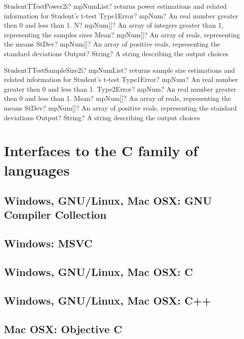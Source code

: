 \documentclass[12pt,a4paper,openany]{book}
\begin{document}
\begin{mpFunctionsExtract}
\mpFunctionFiveNotImplemented
{StudentTTestPower2i? mpNumList? returns power estimations and related information for Student's t-test}
{Type1Error? mpNum? An real number greater then 0 and less than 1.}
{N? mpNum[]? An array of integers greater than 1, representing the samples sizes}
{Mean? mpNum[]? An array of reals, representing the means}
{StDev? mpNum[]? An array of positive reals, representing the standard deviations}
{Output? String? A string describing the output choices}
\end{mpFunctionsExtract}

\begin{mpFunctionsExtract}
\mpFunctionFiveNotImplemented
{StudentTTestSampleSize2i? mpNumList? returns sample size estimations and related information for Student's t-test}
{Type1Error? mpNum? An real number greater then 0 and less than 1.}
{Type2Error? mpNum? An real number greater then 0 and less than 1.}
{Mean? mpNum[]? An array of reals, representing the means}
{StDev? mpNum[]? An array of positive reals, representing the standard deviations}
{Output? String? A string describing the output choices}
\end{mpFunctionsExtract}

\chapter{Interfaces to the C family of languages}

\section{Windows, GNU/Linux, Mac OSX: GNU Compiler Collection}

\section{Windows: MSVC}

\section{Windows, GNU/Linux, Mac OSX: C}

\section{Windows, GNU/Linux, Mac OSX: C++}

\section{Mac OSX: Objective C}
\end{document}
